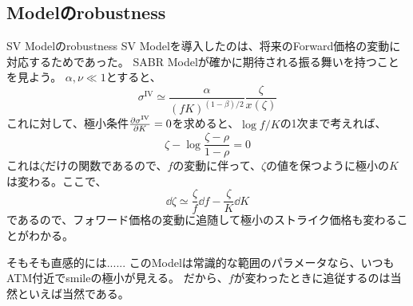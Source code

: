 \documentclass[dvipdfmx,9pt]{beamer}
\begin{document}
\subsection{Modelのrobustness}
\begin{frame}{SV Modelのrobustness}
  SV Modelを導入したのは、将来のForward価格の変動に対応するためであった。
  SABR Modelが確かに期待される振る舞いを持つことを見よう。
  $\alpha,\nu \ll 1$とすると、
  \begin{equation}
    \sigma^{\mathrm{IV}} \simeq \frac{\alpha}{(fK)^{(1-\beta)/2}}\frac{\zeta}{x(\zeta)}
  \end{equation}
  これに対して、極小条件$\pdv{\sigma^{\mathrm{IV}}}{K} = 0$を求めると、$\log f/K$の1次まで考えれば、
  \begin{equation}
    \zeta - \log \frac{\zeta - \rho}{1 - \rho} = 0
  \end{equation}
  これは$\zeta$だけの関数であるので、$f$の変動に伴って、$\zeta$の値を保つように極小の$K$は変わる。ここで、
  \begin{equation}
    \dd \zeta \simeq \frac{\zeta}{f} \dd f - \frac{\zeta}{K} \dd K
  \end{equation}
  であるので、フォワード価格の変動に追随して極小のストライク価格も変わることがわかる。
  \begin{alertblock}{そもそも直感的には......}
    このModelは常識的な範囲のパラメータなら、いつもATM付近でsmileの極小が見える。
    だから、$f$が変わったときに追従するのは当然といえば当然である。
  \end{alertblock}
\end{frame}
\end{document}
